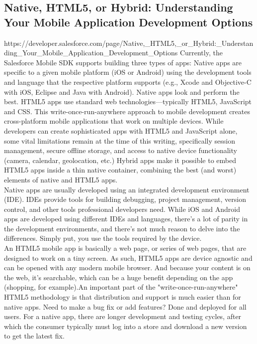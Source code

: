 \subsection{Native, HTML5, or Hybrid: Understanding Your Mobile Application Development Options}
https://developer.salesforce.com/page/Native,_HTML5,_or_Hybrid:_Understanding_Your_Mobile_Application_Development_Options
Currently, the Salesforce Mobile SDK supports building three types of apps:
Native apps are specific to a given mobile platform (iOS or Android) using the development tools and language that the respective platform supports (e.g., Xcode and Objective-C with iOS, Eclipse and Java with Android). Native apps look and perform the best.
HTML5 apps use standard web technologies—typically HTML5, JavaScript and CSS. This write-once-run-anywhere approach to mobile development creates cross-platform mobile applications that work on multiple devices. While developers can create sophisticated apps with HTML5 and JavaScript alone, some vital limitations remain at the time of this writing, specifically session management, secure offline storage, and access to native device functionality (camera, calendar, geolocation, etc.)
Hybrid apps make it possible to embed HTML5 apps inside a thin native container, combining the best (and worst) elements of native and HTML5 apps.\\
Native apps are usually developed using an integrated development environment (IDE). IDEs provide tools for building debugging, project management, version control, and other tools professional developers need. While iOS and Android apps are developed using different IDEs and languages, there’s a lot of parity in the development environments, and there’s not much reason to delve into the differences. Simply put, you use the tools required by the device.\\
An HTML5 mobile app is basically a web page, or series of web pages, that are designed to work on a tiny screen. As such, HTML5 apps are device agnostic and can be opened with any modern mobile browser. And because your content is on the web, it's searchable, which can be a huge benefit depending on the app (shopping, for example).An important part of the "write-once-run-anywhere" HTML5 methodology is that distribution and support is much easier than for native apps. Need to make a bug fix or add features? Done and deployed for all users. For a native app, there are longer development and testing cycles, after which the consumer typically must log into a store and download a new version to get the latest fix.
